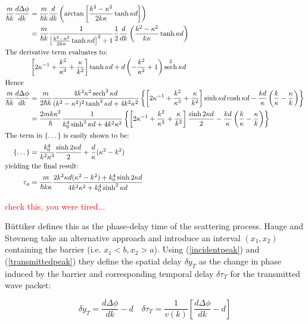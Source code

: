 \documentclass{article}
\DeclareMathOperator{\sech}{sech}
\begin{document}
\begin{align}
	\frac{m}{\hbar k}\frac{d\Delta\phi}{dk}&=\frac{m}{\hbar k}\frac{d}{dk}\left(\arctan{\left[\frac{k^2-\kappa^2}{2k\kappa}\tanh{\kappa d}\right]}\right) \\
					       &=\frac{m}{\hbar k}\frac{1}{\left[\frac{k^2-\kappa^2}{2k\kappa}\tanh{\kappa d}\right]^2+1}\frac{1}{2}\frac{d}{dk}\left(\frac{k^2-\kappa^2}{k\kappa}\tanh{\kappa d}\right) \\ \intertext{The derivative term evaluates to:}
					       &\left[2\kappa^{-1}+\frac{k^2}{\kappa^3}+\frac{\kappa}{k^2}\right]\tanh{\kappa d} + d\left(-\frac{k^2}{\kappa^2}+1\right)\sech^2{\kappa d}\\ \intertext{Hence}
	\frac{m}{\hbar k}\frac{d\Delta\phi}{dk}&=\frac{m}{2\hbar k}\frac{4k^2\kappa^2\sech^2{\kappa d}}{(k^2-\kappa^2)^2\tanh^2{\kappa d}+4k^2\kappa^2}\left\{\left[2\kappa^{-1}+\frac{k^2}{\kappa^3}+\frac{\kappa}{k^2}\right]\sinh{\kappa d}\cosh{\kappa d}-\frac{kd}{\kappa}\left(\frac{k}{\kappa}-\frac{\kappa}{k}\right)\right\}\\
					       &=\frac{2mk\kappa^2}{\hbar}\frac{1}{k_0^4\sinh^2{\kappa d}+4k^2\kappa^2}\left\{\left[2\kappa^{-1}+\frac{k^2}{\kappa^3}+\frac{\kappa}{k^2}\right]\frac{\sinh{2\kappa d}}{2}-\frac{kd}{\kappa}\left(\frac{k}{\kappa}-\frac{\kappa}{k}\right)\right\} \\ \intertext{The term in \{\dots\} is easily shown to be:}
	\{\dots\} &= \frac{k_0^4}{k^2\kappa^3}\frac{\sinh{2\kappa d}}{2}+\frac{d}{\kappa}(\kappa^2-k^2) \\ \intertext{yielding the final result:}
	\tau_\phi &= \frac{m}{\hbar k \kappa}\frac{2k^2\kappa d(\kappa^2-k^2)+k_0^4\sinh{2\kappa d}}{4k^2\kappa^2+k_0^4\sinh^2{\kappa d}} \label{phasedelaytime}
\end{align}

\textcolor{red}{check this, you were tired...}

\noindent B{\"u}ttiker defines this as the phase-delay time of the scattering process. Hauge and St{\o}vneng take an alternative approach and introduce an interval $(x_1, x_2)$ containing the barrier (i.e. $x_1<b,x_2>a$). Using (\ref{incidentpeak}) and (\ref{transmittedpeak}) they define the spatial delay $\delta y_T$ as the change in phase induced by the barrier and corresponding temporal delay $\delta\tau_T$ for the transmitted wave packet:

\begin{equation}
	\delta y_T = \frac{d\Delta\phi}{dk}-d \quad \delta\tau_T=\frac{1}{v(k)} \left[\frac{d\Delta\phi}{dk}-d\right]
	\label{transmittedphaseshift}
\end{equation}
\end{document}
